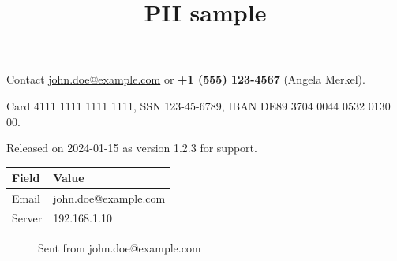 \documentclass[11pt,a4paper]{article}
\title{PII sample}
\begin{document}
\maketitle

Contact \href{mailto:john.doe@example.com}{john.doe@example.com} or \textbf{+1 (555) 123-4567} (Angela Merkel).

Card 4111 1111 1111 1111, SSN 123-45-6789, IBAN DE89 3704 0044 0532 0130 00.

Released on 2024-01-15 as version 1.2.3 for support.

\begin{table}[h]
\begin{tabular}{|l|l|}
\hline
Field & Value \\ \hline
Email & john.doe@example.com \\ \hline
Server & 192.168.1.10 \\ \hline
\end{tabular}
\end{table}

\begin{figure}[h]
\caption{Sent from john.doe@example.com}
\end{figure}
\end{document}
